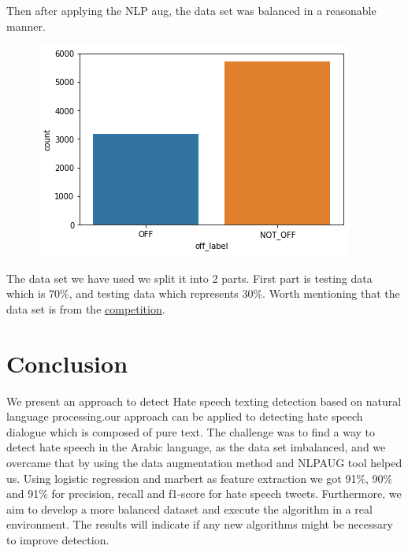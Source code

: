 \documentclass{IEEEtran}
\begin{document}
Then after applying the NLP aug, the data set was balanced in a reasonable manner.

\begin{figure}[htbp]
	\includegraphics[width=\columnwidth, height=0.22\paperheight]{01.png}
\end{figure}

The data set we have used we split it into 2 parts. First part is testing data which is 70\%, and testing data which represents 30\%. Worth mentioning that the data set is from the \href{https://sites.google.com/view/arabichate2022/home}{competition}.

\section{Conclusion}
We present an approach to detect Hate speech texting detection based on natural language processing.our approach can be applied to detecting hate speech dialogue which is composed of pure text.
The challenge was to find a way to detect hate speech in the Arabic language, as the data set imbalanced, and we overcame that by using the data augmentation method and NLPAUG tool helped us.
Using logistic regression and marbert as feature extraction we got 91\%, 90\% and 91\% for precision, recall and f1-score for hate speech tweets.
Furthermore, we aim to develop a more balanced dataset and execute the algorithm in a real environment. The results will indicate if any new algorithms might be necessary to improve
detection.



%
%



\end{document}
